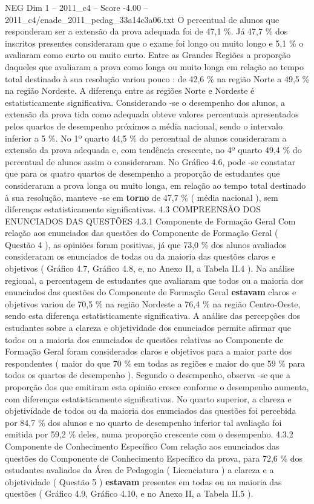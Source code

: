 \begin{textsample}{NEG Dim 1 – 2011\_c4 – Score -4.00 – 2011\_c4/enade\_2011\_pedag\_33a14c3a06.txt}
O percentual de alunos que responderam ser a extensão da prova adequada foi de 47,1 \%.
Já 47,7 \% dos inscritos presentes consideraram que o exame foi longo ou muito longo e 5,1 \% o avaliaram como curto ou muito curto.
Entre as Grandes Regiões a proporção daqueles que avaliaram a prova como longa ou muito longa em relação ao tempo total destinado à sua resolução variou pouco : de 42,6 \% na região Norte a 49,5 \% na região Nordeste.
A diferença entre as regiões Norte e Nordeste é estatisticamente significativa.
Considerando -se o desempenho dos alunos, a extensão da prova tida como adequada obteve valores percentuais apresentados pelos quartos de desempenho próximos a média nacional, sendo o intervalo inferior a 5 \%.
No 1º quarto 44,5 \% do percentual de alunos consideraram a extensão da prova adequada e, com tendência crescente, no 4º quarto 49,4 \% do percentual de alunos assim o consideraram.
No Gráfico 4.6, pode -se constatar que para os quatro quartos de desempenho a proporção de estudantes que consideraram a prova longa ou muito longa, em relação ao tempo total destinado à sua resolução, manteve -se em \textbf{torno} de 47,7 \% ( média nacional ), sem diferenças estatisticamente significativas. 4.3 COMPREENSÃO DOS ENUNCIADOS DAS QUESTÕES 4.3.1 Componente de Formação Geral Com relação aos enunciados das questões do Componente de Formação Geral ( Questão 4 ), as opiniões foram positivas, já que 73,0 \% dos alunos avaliados consideraram os enunciados de todas ou da maioria das questões claros e objetivos ( Gráfico 4.7, Gráfico 4.8, e, no Anexo II, a Tabela II.4 ).
Na análise regional, a percentagem de estudantes que avaliaram que todos ou a maioria dos enunciados das questões do Componente de Formação Geral \textbf{estavam} claros e objetivos variou de 70,5 \% na região Nordeste a 76,4 \% na região Centro-Oeste, sendo esta diferença estatisticamente significativa.
A análise das percepções dos estudantes sobre a clareza e objetividade dos enunciados permite afirmar que todos ou a maioria dos enunciados de questões relativas ao Componente de Formação Geral foram considerados claros e objetivos para a maior parte dos respondentes ( maior do que 70 \% em todas as regiões e maior do que 59 \% para todos os quartos de desempenho ).
Segundo o desempenho, observa -se que a proporção dos que emitiram esta opinião cresce conforme o desempenho aumenta, com diferenças estatisticamente significativas.
No quarto superior, a clareza e objetividade de todos ou da maioria dos enunciados das questões foi percebida por 84,7 \% dos alunos e no quarto de desempenho inferior tal avaliação foi emitida por 59,2 \% deles, numa proporção crescente com o desempenho. 4.3.2 Componente de Conhecimento Específico Com relação aos enunciados das questões do Componente de Conhecimento Específico da prova, para 72,6 \% dos estudantes avaliados da Área de Pedagogia ( Licenciatura ) a clareza e a objetividade ( Questão 5 ) \textbf{estavam} presentes em todas ou na maioria das questões ( Gráfico 4.9, Gráfico 4.10, e no Anexo II, a Tabela II.5 ).

\end{textsample}
